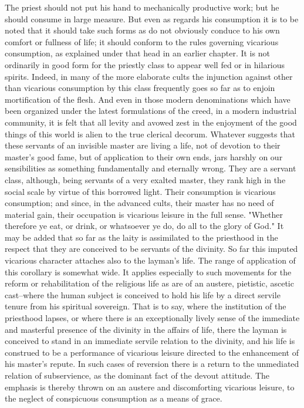 \documentclass[12pt]{report}
\begin{document}
The priest should not put his hand to mechanically productive work; but
he should consume in large measure. But even as regards his consumption
it is to be noted that it should take such forms as do not obviously
conduce to his own comfort or fullness of life; it should conform to the
rules governing vicarious consumption, as explained under that head in
an earlier chapter. It is not ordinarily in good form for the priestly
class to appear well fed or in hilarious spirits. Indeed, in many of
the more elaborate cults the injunction against other than vicarious
consumption by this class frequently goes so far as to enjoin
mortification of the flesh. And even in those modern denominations which
have been organized under the latest formulations of the creed, in a
modern industrial community, it is felt that all levity and avowed zest
in the enjoyment of the good things of this world is alien to the true
clerical decorum. Whatever suggests that these servants of an invisible
master are living a life, not of devotion to their master's good fame,
but of application to their own ends, jars harshly on our sensibilities
as something fundamentally and eternally wrong. They are a servant
class, although, being servants of a very exalted master, they rank high
in the social scale by virtue of this borrowed light. Their consumption
is vicarious consumption; and since, in the advanced cults, their master
has no need of material gain, their occupation is vicarious leisure in
the full sense. "Whether therefore ye eat, or drink, or whatsoever ye
do, do all to the glory of God." It may be added that so far as the
laity is assimilated to the priesthood in the respect that they are
conceived to be servants of the divinity. So far this imputed vicarious
character attaches also to the layman's life. The range of application
of this corollary is somewhat wide. It applies especially to such
movements for the reform or rehabilitation of the religious life as
are of an austere, pietistic, ascetic cast--where the human subject is
conceived to hold his life by a direct servile tenure from his spiritual
sovereign. That is to say, where the institution of the priesthood
lapses, or where there is an exceptionally lively sense of the immediate
and masterful presence of the divinity in the affairs of life, there
the layman is conceived to stand in an immediate servile relation to
the divinity, and his life is construed to be a performance of vicarious
leisure directed to the enhancement of his master's repute. In such
cases of reversion there is a return to the unmediated relation of
subservience, as the dominant fact of the devout attitude. The emphasis
is thereby thrown on an austere and discomforting vicarious leisure, to
the neglect of conspicuous consumption as a means of grace.
\end{document}
